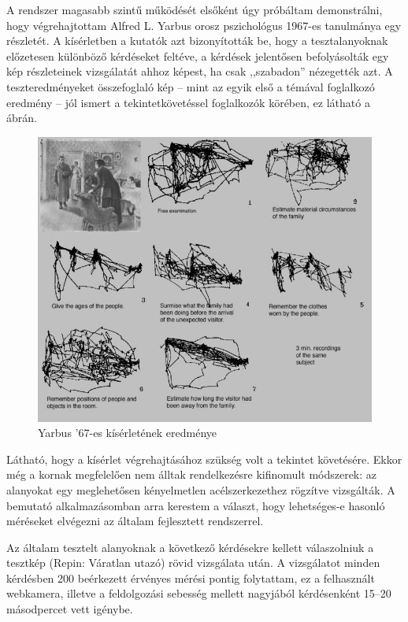 A rendszer magasabb szintű működését elsőként úgy próbáltam demonstrálni, hogy végrehajtottam Alfred L. Yarbus orosz pszichológus 1967-es tanulmánya egy részletét. A kísérletben a kutatók azt bizonyították be, hogy a tesztalanyoknak előzetesen különböző kérdéseket feltéve, a kérdések jelentősen befolyásolták egy kép részleteinek vizsgálatát ahhoz képest, ha csak ,,szabadon'' nézegették azt. A teszteredményeket összefoglaló kép -- mint az egyik első a témával foglalkozó eredmény -- jól ismert a tekintetkövetéssel foglalkozók körében, ez látható a  ábrán.

\begin{figure}[!ht]
\centering
\includegraphics[width=140mm, keepaspectratio]{figures/yarbus.jpg}
\caption{Yarbus '67-es kísérletének eredménye}
\label{fig:yarbus}
\end{figure}

Látható, hogy a kísérlet végrehajtásához szükség volt a tekintet követésére. Ekkor még a kornak megfelelően nem álltak rendelkezésre kifinomult módszerek: az alanyokat egy meglehetősen kényelmetlen acélszerkezethez rögzítve vizsgálták. A bemutató alkalmazásomban arra kerestem a választ, hogy lehetséges-e hasonló méréseket elvégezni az általam fejlesztett rendszerrel.

\bigskip

Az általam tesztelt alanyoknak a következő kérdésekre kellett válaszolniuk a tesztkép (Repin: Váratlan utazó) rövid vizsgálata után. A vizsgálatot minden kérdésben 200 beérkezett érvényes mérési pontig folytattam, ez a felhasznált webkamera, illetve a feldolgozási sebesség mellett nagyjából kérdésenként 15--20 másodpercet vett igénybe.

